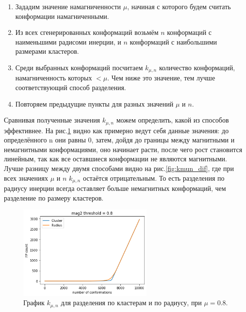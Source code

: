 \begin{enumerate}
	\item Зададим значение намагниченности $\mu$, начиная с которого будем считать конформации намагниченными.
	\item Из всех сгенерированных конформаций возьмём $n$ конформаций с наименьшими радисоми инерции, и $n$ конформаций с наибольшими размерами кластеров.
	\item Среди выбранных конформаций посчитаем $k_{\mu, n}$ количество конформаций, намагниченность которых $< \mu$. Чем ниже это значение, тем лучше соответствующий способ разделения.
	\item Повторяем предыдущие пункты для разных значений $\mu$ и $n$.
\end{enumerate}

Сравнивая полученные значения $k_{\mu, n}$ можем определить, какой из способов эффективнее. На рис.\ref{fig:kmun_example} видно как примерно ведут себя данные значения: до определённого n они равны 0, затем, дойдя до границы между магнитными и немагнитными конформациями, оно начинает расти, после чего рост становится линейным, так как все оставшиеся конформации не являются магнитными. 
Лучше разницу между двумя способами видно на рис.\ref{fig:kmun_dif}, где при всех значениях $\mu$ и $n$ $k_{\mu, n}$ остаётся отрицательным. То есть разделения по радиусу инерции всегда оставляет больше немагнитных конформаций, чем разделение по размеру кластеров.

\begin{figure}[h]
	\centering
	\includegraphics[width=0.6\textwidth]{../images/cluster_and_radius_mu0.8.png} 
	\caption{График $k_{\mu, n}$ для разделения по кластерам и по радиусу, при $\mu = 0.8$.}
	\label{fig:kmun_example}
\end{figure}


